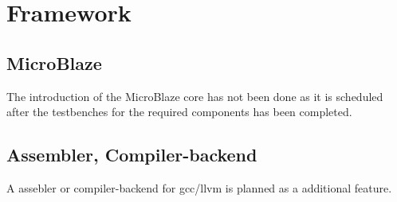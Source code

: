 \section{Framework}

\subsection{MicroBlaze}
The introduction of the MicroBlaze core has not been done as it is scheduled after the testbenches for the required components has been completed.

\subsection{Assembler, Compiler-backend}
A assebler or compiler-backend for gcc/llvm is planned as a additional feature.
